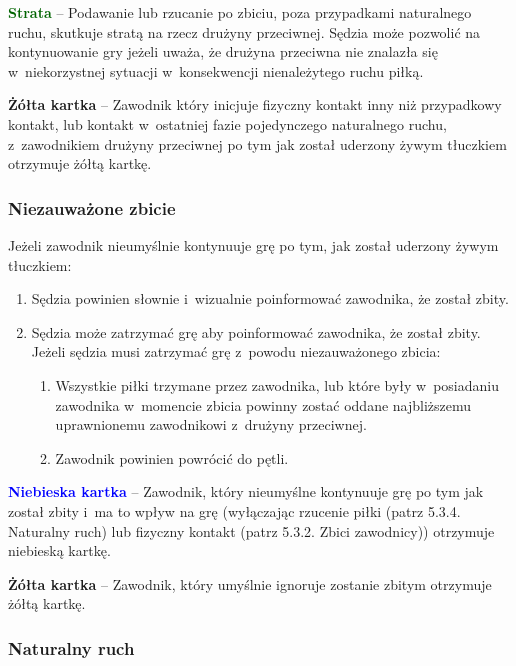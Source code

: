\documentclass[12pt,a4paper]{article}
\newcommand\yellowcard[1]{\bgroup\textcolor{darkyellow}{\textbf{#1}}}
\newcommand\bluecard[1]{\bgroup\textcolor{blue}{\textbf{#1}}}
\newcommand\other[1]{\bgroup\textcolor{darkgreen}{\textbf{#1}}}
\begin{document}
\other{Strata} -- Podawanie lub rzucanie po zbiciu, poza przypadkami
naturalnego ruchu, skutkuje stratą na rzecz drużyny przeciwnej. Sędzia może pozwolić na
kontynuowanie gry jeżeli uważa, że drużyna przeciwna nie znalazła się w~niekorzystnej sytuacji w~konsekwencji nienależytego ruchu piłką.

\yellowcard{Żółta kartka} -- Zawodnik który inicjuje fizyczny kontakt inny niż
przypadkowy kontakt, lub kontakt w~ostatniej fazie pojedynczego
naturalnego ruchu, z~zawodnikiem drużyny przeciwnej po tym jak został
uderzony żywym tłuczkiem otrzymuje żółtą kartkę.

\subsubsection{Niezauważone zbicie}

Jeżeli zawodnik nieumyślnie kontynuuje grę po tym, jak został uderzony
żywym tłuczkiem:
\begin{enumerate}
	\item Sędzia powinien słownie i~wizualnie poinformować zawodnika, że został
	      zbity.

	\item Sędzia może zatrzymać grę aby poinformować zawodnika, że został
	      zbity. Jeżeli sędzia musi zatrzymać grę z~powodu niezauważonego zbicia:
	      \begin{enumerate}
		      \item Wszystkie piłki trzymane przez zawodnika, lub które były w~posiadaniu
		            zawodnika w~momencie zbicia powinny zostać oddane najbliższemu
		            uprawnionemu zawodnikowi z~drużyny przeciwnej.

		      \item Zawodnik powinien powrócić do pętli.
	      \end{enumerate}
\end{enumerate}

\bluecard{Niebieska kartka} -- Zawodnik, który nieumyślne kontynuuje grę po
tym jak został zbity i~ma to wpływ na grę (wyłączając rzucenie piłki
(patrz 5.3.4. Naturalny ruch) lub fizyczny kontakt (patrz 5.3.2.
Zbici zawodnicy)) otrzymuje niebieską kartkę.

\yellowcard{Żółta kartka} -- Zawodnik, który umyślnie ignoruje zostanie zbitym
otrzymuje żółtą kartkę.

\subsubsection{Naturalny ruch}
\end{document}
